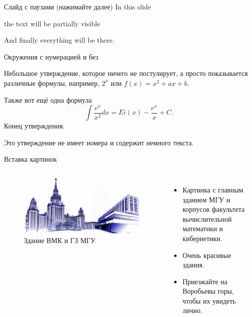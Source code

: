 \documentclass[nooutline]{../cmcbeamer}
\begin{document}
\begin{frame}{Слайд с паузами (нажимайте далее)}
 In this slide \pause%

 the text will be partially visible \pause%

 And finally everything will be there.
\end{frame}

\begin{frame}{Окружения с нумерацией и без}
  \begin{proposition}\label{prop:example:test}
    Небольшое утверждение, которое ничего не постулирует, а просто
    показывается различные формулы, например, \(2^{x}\) или
    \(f(x)=x^{2}+ax+ b\).

    Также вот ещё одна формула
    \[
      \int\frac{e^{x}}{x^{2}}dx=Ei(x)-\frac{e^{x}}{x}+C.
    \]
    Конец утверждения.
  \end{proposition}

  \begin{proposition*}
    Это утверждение не имеет номера и содержит немного текста.
  \end{proposition*}
\end{frame}

\begin{frame}{Вставка картинок}
  \begin{columns}
    \begin{figure}[H]
      \centering
      \includegraphics[scale=0.2]{images/msu-cmc-logo.png}
      \caption{Здание ВМК и ГЗ МГУ}\label{fig:example:cmc-gz}
    \end{figure}

    \begin{itemize}
    \item Картинка с главным зданием МГУ и корпусов факультета
      вычислительной математики и кибернетики.
    \item Очень красивые здания.
    \item Приезжайте на Воробьевы горы, чтобы их увидеть лично.
    \end{itemize}
    
  \end{columns}
\end{frame}
\end{document}
